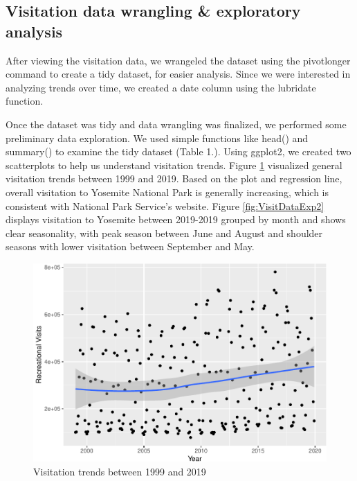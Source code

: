 \documentclass[
  12pt,
]{article}
\begin{document}
\newpage

\hypertarget{visitation-data-wrangling-exploratory-analysis}{%
\subsection{Visitation data wrangling \& exploratory analysis}\label{visitation-data-wrangling-exploratory-analysis}}

After viewing the visitation data, we wrangeled the dataset using the pivotlonger command to create a tidy dataset, for easier analysis. Since we were interested in analyzing trends over time, we created a date column using the lubridate function.

Once the dataset was tidy and data wrangling was finalized, we performed some preliminary data exploration. We used simple functions like head() and summary() to examine the tidy dataset (Table 1.). Using ggplot2, we created two scatterplots to help us understand visitation trends. Figure \ref{fig:VisitDataExp1} visualized general visitation trends between 1999 and 2019. Based on the plot and regression line, overall visitation to Yosemite National Park is generally increasing, which is consistent with National Park Service's website. Figure \ref{fig:VisitDataExp2} displays visitation to Yosemite between 2019-2019 grouped by month and shows clear seasonality, with peak season between June and August and shoulder seasons with lower visitation between September and May.\\

\begin{figure}

{\centering \includegraphics[width=0.6\linewidth]{CodeFinal_files/figure-latex/VisitDataExp1-1} 

}

\caption{Visitation trends between 1999 and 2019}\label{fig:VisitDataExp1}
\end{figure}
\end{document}
